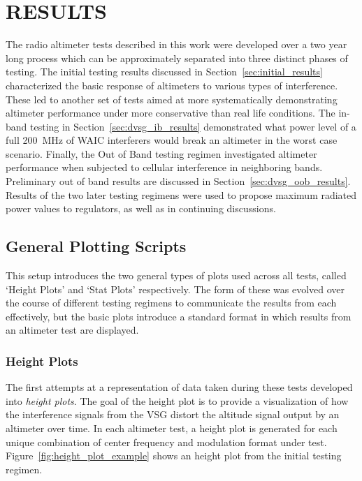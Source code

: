 %
%
%
%

\chapter{RESULTS}
The radio altimeter tests described in this work were developed over a two year long process which can be approximately separated into three distinct phases of testing. The initial testing results discussed in Section~\ref{sec:initial_results} characterized the basic response of altimeters to various types of interference. These led to another set of tests aimed at more systematically demonstrating altimeter performance under more conservative than real life conditions. The in-band testing in Section~\ref{sec:dvsg_ib_results} demonstrated what power level of a full 200~MHz of WAIC interferers would break an altimeter in the worst case scenario. Finally, the Out of Band testing regimen investigated altimeter performance when subjected to cellular interference in neighboring bands. Preliminary out of band results are discussed in Section~\ref{sec:dvsg_oob_results}. Results of the two later testing regimens were used to propose maximum radiated power values to  regulators, as well as in continuing discussions. 

\section{General Plotting Scripts}
This setup introduces the two general types of plots used across all tests, called `Height Plots' and `Stat Plots' respectively. The form of these was evolved over the course of different testing regimens to communicate the results from each effectively, but the basic plots introduce a standard format in which results from an altimeter test are displayed. 


\subsection{Height Plots}
The first attempts at a representation of data taken during these tests developed into \textit{height plots}. The goal of the height plot is to provide a visualization of how the interference signals from the VSG  distort the altitude signal output by an altimeter over time. In each altimeter test, a height plot is generated for each unique combination of center frequency and modulation format under test. Figure~\ref{fig:height_plot_example} shows an height plot from the initial testing regimen. 

